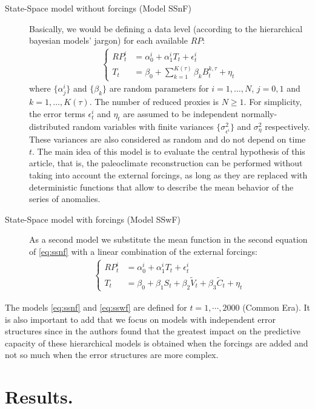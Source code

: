 \documentclass[11pt]{amsart}
\theoremstyle{plain}
\theoremstyle{definition}
\theoremstyle{remark}
\begin{document}
\begin{description}
\item[State-Space model without forcings (Model SSnF)]
Basically, we would be defining a data level (according to the hierarchical bayesian models' jargon)
  for each available $RP$:
\begin{align}\label{eq:ssnf}
  \begin{cases}
    RP_t^i&=\alpha_0^i+\alpha_1^iT_t+\epsilon^i_t\\
  T_t&=\beta_0+\sum_{k=1}^{K(\tau)}\beta_k B_t^{k,\tau}+\eta_t
  \end{cases}
\end{align}
where $\{\alpha^i_j\}$ and $\{\beta_k\}$ are random parameters for
$i=1,\ldots,N$, $j=0,1$ and $k=1,\ldots,K(\tau)$. The number of reduced proxies is
$N\geq 1$. For simplicity, the error terms
$\epsilon^i_t$ and $\eta_t$ are assumed to be
independent normally-distributed random variables with finite variances
$\{\sigma^2_{\epsilon^i}\}$ and $\sigma^2_{\eta}$ respectively. These variances
are also considered as random and do not depend on time $t$. The main idea of
this model is to evaluate the central hypothesis of this article, that is, the
paleoclimate reconstruction can be performed without taking into account the
external forcings, as long as they are replaced with deterministic
functions that allow to describe the mean behavior of the series of anomalies.
\item[State-Space model with forcings (Model SSwF)]
As a second model we substitute the mean function in the second equation of
\eqref{eq:ssnf} with a linear combination of the external forcings:    
\begin{align}\label{eq:sswf}
  \begin{cases}
    RP_t^i&=\alpha_0^i+\alpha_1^iT_t+\epsilon^i_t\\
  T_t&=\beta_0+\beta_1S_t+\beta_2\tilde V_t+\beta_3\tilde C_t+\eta_t
  \end{cases}
\end{align}
\end{description}
The models \eqref{eq:ssnf} and \eqref{eq:sswf} are defined for
$t=1,\cdots,2000$ (Common Era). It is also important to add that we focus on
models with independent error structures since in \cite{Barboza2014} the authors
found that the greatest impact on the predictive capacity of these hierarchical
models is obtained when the forcings are added and not so much when the error
structures are more complex.

\section{Results.}
\label{sec:results}
\end{document}

